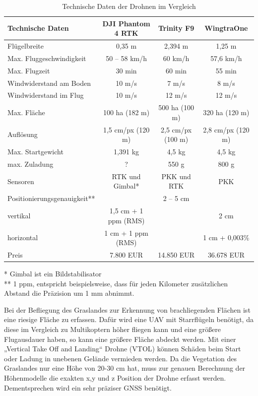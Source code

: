 \begin{table}[htbp]
\selectfont
\small
\begin{tabular}{lccc} %

\textbf{Technische Daten} & \textbf{DJI Phantom 4 RTK} & \textbf{Trinity F9}  & \textbf{WingtraOne} \\ %
\hline\hline
Flügelbreite & 0,35 m & 2,394 m & 1,25 m \\
Max. Fluggeschwindigkeit & 50 – 58 km/h & 60 km/h & 57,6 km/h \\
Max. Flugzeit & 30 min & 60 min & 55 min \\
Windwiderstand am Boden & 10 m/s & 7 m/s & 8 m/s \\
Windwiderstand im Flug & 10 m/s & 12 m/s & 12 m/s \\
Max. Fläche & 100 ha (182 m) & 500 ha (100 m) & 320 ha (120 m) \\
Auflösung & 1,5 cm/px (120 m) & 2,5 cm/px (100 m) & 2,8 cm/px (120 m) \\
Max. Startgewicht & 1,391 kg & 4,5 kg & 4,5 kg \\
max. Zuladung & ?  & 550 g & 800 g \\
Sensoren & RTK und Gimbal* & PKK und RTK & PKK \\
Positionierungsgenauigkeit** &  & 2 – 5 cm &  \\
vertikal & 1,5 cm + 1 ppm (RMS) &  & 2 cm  \\
horizontal & 1 cm + 1 ppm (RMS) &  & 1 cm + 0,003\% \\
Preis & 7.800 EUR & 14.850 EUR & 36.678 EUR\\

\hline
\end{tabular}
* Gimbal ist ein Bildstabilisator \\
** 1 ppm, entspricht beispielsweise, dass für jeden Kilometer zusätzlichen Abstand die Präzision um 1 mm abnimmt.
\caption[Tabelle]{Technische Daten der Drohnen im Vergleich}
\label{tab:toll1}
\end{table}

Bei der Befliegung des Graslandes zur Erkennung von brachliegenden Flächen ist eine riesige Fläche zu erfassen. Dafür wird eine UAV mit Starrflügeln benötigt, da diese im Vergleich zu Multikoptern höher fliegen kann und eine größere Flugausdauer haben, so kann eine größere Fläche abdeckt werden. Mit einer „Vertical Take Off and Landing“ Drohne (VTOL) können Schäden beim Start oder Ladung in unebenen Gelände vermieden werden. Da die Vegetation des Graslandes nur eine Höhe von 20-30 cm hat, muss zur genauen Berechnung der Höhenmodelle die exakten x,y und z Position der Drohne erfasst werden. Dementsprechen wird ein sehr präziser GNSS benötigt. 

